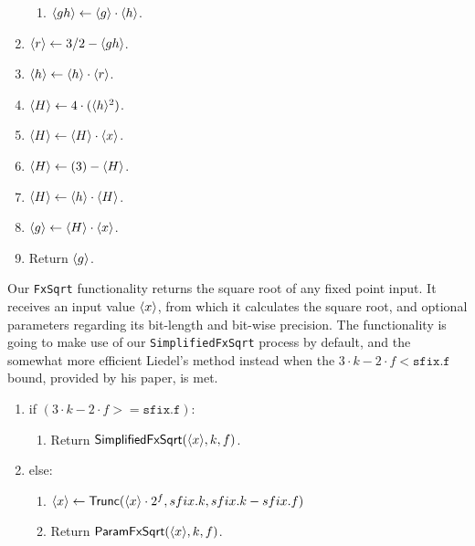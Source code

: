 \begin{enumerate}
\begin{enumerate}
          \item $\langle gh \rangle \leftarrow \langle g \rangle \cdot \langle h \rangle$.
        \end{enumerate}
  \item $\langle r \rangle \leftarrow 3/2-\langle gh \rangle$.
  \item $\langle h \rangle \leftarrow \langle h \rangle \cdot \langle r \rangle$.
  \item $\langle H \rangle \leftarrow 4 \cdot (\langle h \rangle^2)$.
  \item $\langle H \rangle \leftarrow \langle H \rangle\cdot \langle x \rangle$.
  \item $\langle H \rangle \leftarrow (3) - \langle H \rangle$.
  \item $\langle H \rangle \leftarrow \langle h \rangle \cdot \langle H \rangle$.
  \item $\langle g \rangle \leftarrow \langle H \rangle \cdot \langle x \rangle$.
  \item Return $\langle g \rangle$.
\end{enumerate}

Our \verb|FxSqrt| functionality returns the square root of any fixed point input. It receives an input value $\langle x \rangle$, from which it calculates the square root, and optional parameters regarding its bit-length and bit-wise precision. The functionality is going to make use of our \verb|SimplifiedFxSqrt| process by default, and the somewhat more efficient Liedel's method instead when the $3 \cdot k - 2 \cdot f < \mathtt{sfix.f}$ bound, provided by his paper, is met.

\begin{enumerate}
  \item if $(3 \cdot k - 2 \cdot f >= \mathtt{sfix.f})$:
        \begin{enumerate}
          \item Return $\mathsf{SimplifiedFxSqrt}(\langle x \rangle, k, f)$.
        \end{enumerate}
  \item else:
        \begin{enumerate}
		\item $\langle x \rangle \leftarrow \mathsf{Trunc}(\langle x \rangle \cdot 2^{f}, sfix.k, sfix.k-sfix.f)$
          \item Return $\mathsf{ParamFxSqrt}(\langle x \rangle, k, f)$.
        \end{enumerate}
\end{enumerate}

